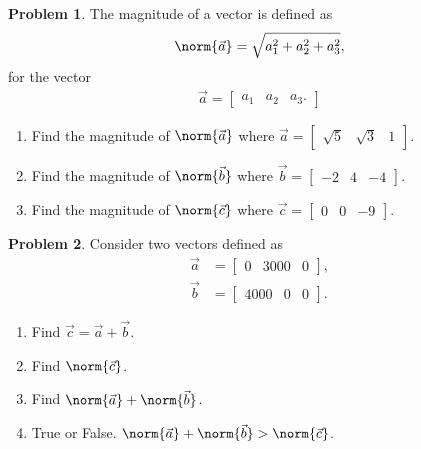 \documentclass[10pt]{article}
\theoremstyle{definition}
\newtheorem{prob}{Problem}[section]
\newenvironment{subprob}%
{\renewcommand{\theenumi}{\alph{enumi}}\renewcommand{\labelenumi}{(\theenumi)}\begin{enumerate}}%
{\end{enumerate}}%
\begin{document}
\begin{prob}
    The magnitude of a vector is defined as 
    \begin{align*}
        \norm{\vec a} = \sqrt{a_1^2 + a_2^2 + a_3^2} ,
    \end{align*}
    for the vector 
    \begin{align*}
        \vec a = \begin{bmatrix} a_1 & a_2 & a_3 . \end{bmatrix}
    \end{align*}

    \begin{subprob}
        \item Find the magnitude of \( \norm{\vec a} \) where \( \vec{a} = \begin{bmatrix} \sqrt{5} & \sqrt{3} & 1 \end{bmatrix} \).
        \item Find the magnitude of \( \norm{\vec b} \) where \( \vec{b} = \begin{bmatrix} -2 & 4 & -4 \end{bmatrix} \). 
        \item Find the magnitude of \( \norm{\vec c} \) where \( \vec{c} = \begin{bmatrix} 0 & 0 & -9\end{bmatrix} \). 
    \end{subprob}
\end{prob}

\begin{prob}
    Consider two vectors defined as
    \begin{align*}
    \vec a &= \begin{bmatrix} 0 & 3000 & 0 \end{bmatrix} , \\
        \vec b &= \begin{bmatrix} 4000 & 0 & 0 \end{bmatrix}.
    \end{align*}

    \begin{subprob}
    \item Find \( \vec c = \vec a + \vec b \).
    \item Find \( \norm{\vec c} \).
    \item Find \( \norm{\vec a} + \norm{\vec b} \).
    \item True or False. \( \norm{\vec a} + \norm{\vec b} > \norm{\vec c} \).
    \end{subprob}
\end{prob}
\end{document}
